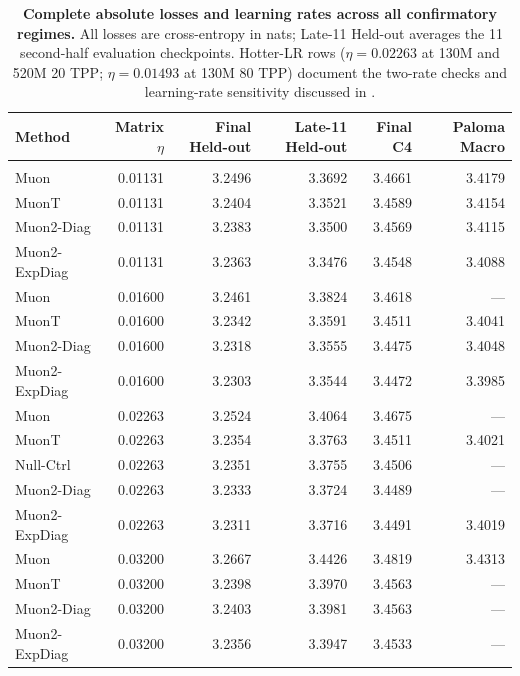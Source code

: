 \begin{table}[tbp]\centering\scriptsize
\setlength{\tabcolsep}{8.5pt}
\caption{\textbf{Complete absolute losses and learning rates across all confirmatory regimes.} All losses are cross-entropy in nats; Late-11 Held-out averages the 11 second-half evaluation checkpoints. Hotter-LR rows ($\eta=0.02263$ at 130M and 520M 20 TPP; $\eta=0.01493$ at 130M 80 TPP) document the two-rate checks and learning-rate sensitivity discussed in .}\label{tab:absolute_results}
\begin{tabularx}{\textwidth}{@{}>{\raggedright\arraybackslash}Xrrrrr@{}}
\toprule
Method & Matrix $\eta$ & Final Held-out & Late-11 Held-out & Final C4 & Paloma Macro \\
\midrule
\addlinespace[2pt]\multicolumn{6}{@{}l}{\textit{130M seed-0 controls: 20 TPP, 2.68B tokens (complete learning-rate bracket)}}\\
Muon & 0.01131 & 3.2496 & 3.3692 & 3.4661 & 3.4179 \\
MuonT & 0.01131 & 3.2404 & 3.3521 & 3.4589 & 3.4154 \\
Muon2-Diag & 0.01131 & 3.2383 & 3.3500 & 3.4569 & 3.4115 \\
Muon2-ExpDiag & 0.01131 & 3.2363 & 3.3476 & 3.4548 & 3.4088 \\
Muon & 0.01600 & 3.2461 & 3.3824 & 3.4618 & --- \\
MuonT & 0.01600 & 3.2342 & 3.3591 & 3.4511 & 3.4041 \\
Muon2-Diag & 0.01600 & 3.2318 & 3.3555 & 3.4475 & 3.4048 \\
Muon2-ExpDiag & 0.01600 & 3.2303 & 3.3544 & 3.4472 & 3.3985 \\
Muon & 0.02263 & 3.2524 & 3.4064 & 3.4675 & --- \\
MuonT & 0.02263 & 3.2354 & 3.3763 & 3.4511 & 3.4021 \\
Null-Ctrl & 0.02263 & 3.2351 & 3.3755 & 3.4506 & --- \\
Muon2-Diag & 0.02263 & 3.2333 & 3.3724 & 3.4489 & --- \\
Muon2-ExpDiag & 0.02263 & 3.2311 & 3.3716 & 3.4491 & 3.4019 \\
Muon & 0.03200 & 3.2667 & 3.4426 & 3.4819 & 3.4313 \\
MuonT & 0.03200 & 3.2398 & 3.3970 & 3.4563 & --- \\
Muon2-Diag & 0.03200 & 3.2403 & 3.3981 & 3.4563 & --- \\
Muon2-ExpDiag & 0.03200 & 3.2356 & 3.3947 & 3.4533 & --- \\

\end{tabularx}
\end{table}
